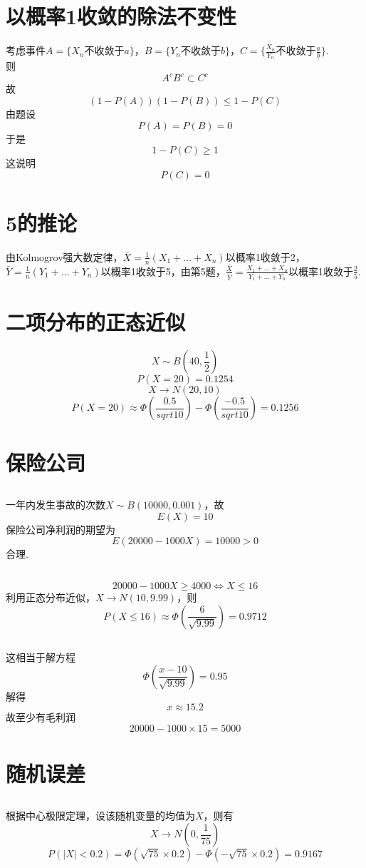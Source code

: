 \documentclass{article}
\begin{document}
\begin{CJK}{UTF8}{gbsn}
\section{以概率1收敛的除法不变性}
考虑事件$A=\{X_{n}$不收敛于$a\}$，$B=\{Y_{n}$不收敛于$b\}$，$C=\{\frac{X_{n}}{Y_{n}}$不收敛于$\frac{a}{b}\}$.
\\则
$$ A^{c}B^{c}\subset C^{c}$$
故
$$ (1-P(A))(1-P(B))\leq 1-P(C)$$
由题设
$$ P(A)=P(B)=0$$
于是
$$ 1-P(C)\geq 1$$
这说明
$$ P(C)=0$$
\section{5的推论}
由Kolmogrov强大数定律，$\bar{X}=\frac{1}{n}(X_{1}+...+X_{n})$以概率1收敛于2，$\bar{Y}=\frac{1}{n}(Y_{1}+...+Y_{n})$以概率1收敛于5，由第5题，$\frac{\bar{X}}{\bar{Y}}=\frac{X_{1}+...+X_{n}}{Y_{1}+...+Y_{n}}$以概率1收敛于$\frac{2}{5}$.
\section{二项分布的正态近似}
$$ X\sim B(40,\frac{1}{2})$$
$$ P(X=20)=0.1254$$
$$ X\to N(20,10)$$
$$ P(X=20)\approx\Phi(\frac{0.5}{sqrt{10}})-\Phi(\frac{-0.5}{sqrt{10}})=0.1256$$
\section{保险公司}
\subsection{}
一年内发生事故的次数$X\sim B(10000,0.001)$，故
$$ E(X)=10$$
保险公司净利润的期望为
$$ E(20000-1000X)=10000>0$$
合理.
\subsection{}
$$ 20000-1000X\geq 4000\Leftrightarrow X\leq 16$$
利用正态分布近似，$X\to N(10,9.99)$，则
$$ P(X\leq 16)\approx\Phi(\frac{6}{\sqrt{9.99}})=0.9712$$
\subsection{}
这相当于解方程
$$ \Phi(\frac{x-10}{\sqrt{9.99}})=0.95$$
解得
$$ x\approx 15.2$$
故至少有毛利润
$$ 20000-1000\times 15=5000$$
\section{随机误差}
\subsection{}
根据中心极限定理，设该随机变量的均值为$X$，则有
$$ X\to N(0,\frac{1}{75})$$
$$ P(|X|<0.2)=\Phi(\sqrt{75}\times0.2)-\Phi(-\sqrt{75}\times0.2)=0.9167$$

\end{CJK}
\end{document}
